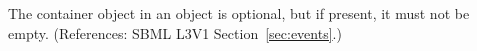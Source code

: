 \removedRule
  {The \ListOfEventAssignments container object in an \Event object is optional, but if present, it must not be empty.}
  {(References: SBML L3V1 Section~\ref{sec:events}.)}


